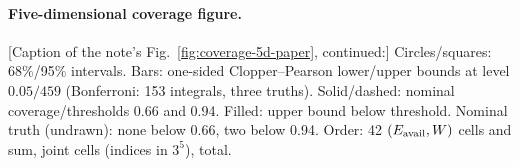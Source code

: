 \paragraph{Five-dimensional coverage figure.} [Caption of the note's Fig.~\ref{fig:coverage-5d-paper}, continued:] Circles/squares: 68\%/95\% intervals. Bars: one-sided Clopper--Pearson lower/upper bounds at level $0.05/459$ (Bonferroni: 153 integrals, three truths). Solid/dashed: nominal coverage/thresholds 0.66 and 0.94. Filled: upper bound below threshold. Nominal truth (undrawn): none below 0.66, two below 0.94. Order: 42 $(E_{\mathrm{avail}},W)$ cells and sum, \jtNcells{} joint cells (indices in $3^5$), total.

